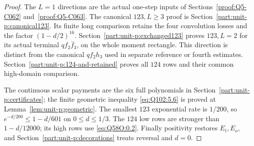 \begin{proof}
The \(L=1\) directions are the actual one-step inputs of
Sections~\ref{proof:Q5-C062} and~\ref{proof:Q5-C063}.
The canonical \(123,L\ge3\) proof is
Section~\ref{part:unit-p:canonical123}. Its finite long
comparison retains the four convolution losses and the factor
\((1-d/2)^{16}\).
Section~\ref{part:unit-p:exchanged123} proves \(123,L=2\)
for its actual terminal \(qf_2\bar f_3\), on the whole moment
rectangle. This direction is distinct from the canonical
\(qf_2h_3\) used in separate reference or fourth estimates.
Section~\ref{part:unit-p:124-and-retained} proves all
\(124\) rows and their common high-domain comparison.

The continuous scalar payments are the six full polynomials
in Section~\ref{part:unit-p:certificates}; the finite
geometric inequality \eqref{eq:Q102:5.6} is proved at
Lemma~\ref{lem:unit-p:geometric}.
The smallest \(123\) exponential rate is \(1/200\), so
\(e^{-d/200}\le1-d/601\) on \(0\le d\le1/3\).
The \(124\) low rows are stronger than \(1-d/12000\);
its high rows use \eqref{eq:Q58O:0.2}.
Finally positivity restores \(E_t,E_o\), and
Section~\ref{part:unit-p:decorations} treats reversal
and \(d=0\).
\end{proof}
